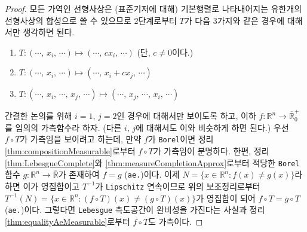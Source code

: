 \begin{proof}
    모든 가역인 선형사상은 (표준기저에 대해) 기본행렬로 나타내어지는 유한개의 선형사상의 합성으로 쓸 수 있으므로 2단계로부터 $T$가 다음 3가지와 같은 경우에 대해서만 생각하면 된다.
    \begin{enumerate}
        \item $T:(\cdots,\,x_i,\,\cdots)\mapsto(\cdots,\,cx_i,\,\cdots)$ (단, $c\ne0$이다.)
        \item $T:(\cdots,\,x_i,\,\cdots)\mapsto(\cdots,\,x_i+cx_j,\,\cdots)$
        \item $T:(\cdots,\,x_i,\,\cdots,\,x_j,\,\cdots)\mapsto(\cdots,\,x_j,\,\cdots,\,x_i,\,\cdots)$
    \end{enumerate}

    간결한 논의를 위해 $i=1,\,j=2$인 경우에 대해서만 보이도록 하고, 이하 $f:\mathbb{R}^n\to\overline{\mathbb{R}}^+_0$를 임의의 가측함수라 하자. (다른 $i,\,j$에 대해서도 이와 비슷하게 하면 된다.) 우선 $f\circ T$가 가측임을 보이려고 하는데, 만약 $f$가 \texttt{Borel}이면 정리 \ref{thm:compositionMeasurable}로부터 $f\circ T$가 가측임이 분명하다. 한편, 정리 \ref{thm:LebesgueComplete}와 \ref{thm:measureCompletionApprox}로부터 적당한 \texttt{Borel} 함수 $g:\mathbb{R}^n\to\overline{\mathbb{R}}$가 존재하여 $f=g$ (\texttt{ae.})이다. 이제 $N=\{x\in\mathbb{R}^n:f(x)\ne g(x)\}$라 하면 이가 영집합이고 $T^{-1}$가 \texttt{Lipschitz} 연속이므로 위의 보조정리로부터 $T^{-1}(N)=\{x\in\mathbb{R}^n:(f\circ T)(x)\ne(g\circ T)(x)\}$가 영집합이 되어 $f\circ T=g\circ T$ (\texttt{ae.})이다. 그렇다면 \texttt{Lebesgue} 측도공간이 완비성을 가진다는 사실과 정리 \ref{thm:equalityAeMeasurable}로부터 $f\circ T$도 가측이다.


\end{proof}
